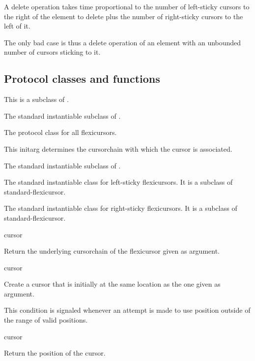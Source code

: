 \documentclass[11pt]{article}
\begin{document}
A delete operation takes time proportional to the number of
left-sticky cursors to the right of the element to delete plus the
number of right-sticky cursors to the left of it. 

The only bad case is thus a delete operation of an element with an
unbounded number of cursors sticking to it. 

\subsection{Protocol classes and functions}


This is a subclass of .


The standard instantiable subclass of .


The protocol class for all flexicursors.


This initarg determines the cursorchain with which the cursor is associated. 


The standard instantiable subclass of . 


The standard instantiable class for left-sticky flexicursors.  It is a
subclass of standard-flexicursor. 


The standard instantiable class for right-sticky flexicursors.  It is a
subclass of standard-flexicursor. 

 {cursor}

Return the underlying cursorchain of the flexicursor given
as argument. 

 {cursor}

Create a cursor that is initially at the same location as the one
given as argument.  


This condition is signaled whenever an attempt is made to use position
outside of the range of valid positions. 

 {cursor}

Return the position of the cursor.
\end{document}
